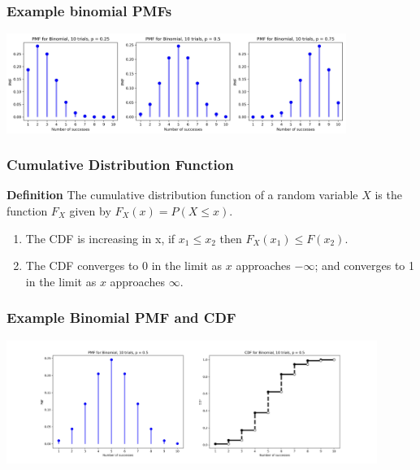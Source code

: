 \documentclass{beamer}
\begin{document}
\begin{frame}
\frametitle{Example binomial PMFs}

\begin{center}
\includegraphics[width=4.35in]{binomial_pmfs.jpg}
\end{center}

\end{frame}



\begin{frame}
\frametitle{Cumulative Distribution Function}

\textbf{Definition} The cumulative distribution function of a random variable $X$ is the function $F_X$ given by $F_X(x) = P(X \leq x)$.

\bigskip
\begin{enumerate}
\item
The CDF is increasing in x, if $x_1 \leq x_2$ then $F_X(x_1) \leq F(x_2)$. 

\bigskip

\item
The CDF converges to 0 in the limit as $x$ approaches $-\infty$; and converges to 1 in the limit as $x$ approaches $\infty$.
\end{enumerate}


\end{frame}


\begin{frame}
\frametitle{Example Binomial PMF and CDF}

\begin{center}
\includegraphics[width=4.75in]{binomial_pmf_cdf.jpg}
\end{center}

\end{frame}
\end{document}
